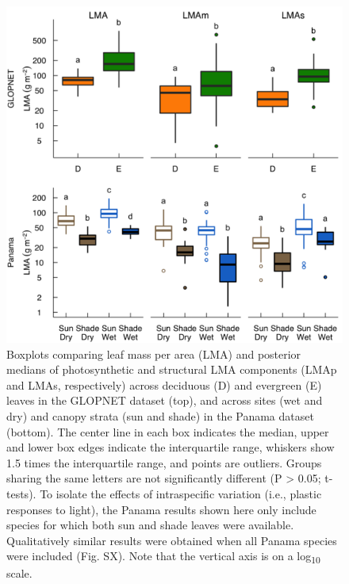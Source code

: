 \documentclass[
  12pt,
]{article}
\begin{document}
\begin{figure}
\hypertarget{fig:boxplt}{%
\centering
\includegraphics{../figs/box_main.png}
\caption{Boxplots comparing leaf mass per area (LMA) and posterior medians of photosynthetic and structural LMA components (LMAp and LMAs, respectively) across deciduous (D) and evergreen (E) leaves in the GLOPNET dataset (top), and across sites (wet and dry) and canopy strata (sun and shade) in the Panama dataset (bottom).
The center line in each box indicates the median, upper and lower box edges indicate the interquartile range, whiskers show 1.5 times the interquartile range, and points are outliers.
Groups sharing the same letters are not significantly different (P \textgreater{} 0.05; t-tests). To isolate the effects of intraspecific variation (i.e., plastic responses to light), the Panama results shown here only include species for which both sun and shade leaves were available.
Qualitatively similar results were obtained when all Panama species were included (Fig. SX).
Note that the vertical axis is on a log\textsubscript{10} scale.}\label{fig:boxplt}
}
\end{figure}

\newpage
\end{document}
